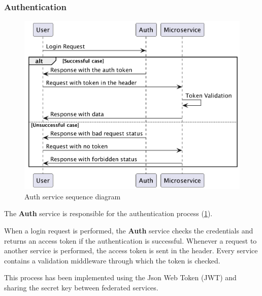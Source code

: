 \documentclass{scrartcl}
\begin{document}
    \subsubsection{Authentication}
    \begin{figure}
        \centering
        \includegraphics[scale=0.3]{img/auth-service-sequence}
        \caption{Auth service sequence diagram}
        \label{fig:auth-service-sequence}
    \end{figure}

    The \textbf{Auth} service is responsible for the authentication process (\cref{fig:auth-service-sequence}).

    When a login request is performed, the \textbf{Auth} service checks the credentials and returns an access token if the authentication is successful.
    Whenever a request to another service is performed, the access token is sent in the header.
    Every service contains a validation middleware through which the token is checked.

    This process has been implemented using the Json Web Token (JWT) and sharing the secret key between federated services.
\end{document}

